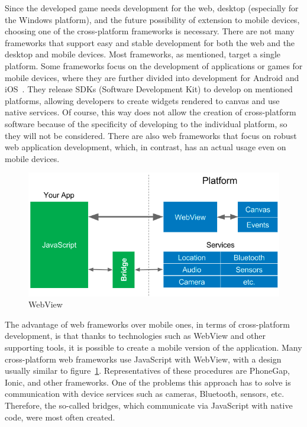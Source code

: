 Since the developed game needs development for the web, desktop (especially for the Windows platform), and the future possibility of extension to mobile devices, choosing one of the cross-platform frameworks is necessary.
There are not many frameworks that support easy and stable development for both the web and the desktop and mobile devices.
Most frameworks, as mentioned, target a single platform.
Some frameworks focus on the development of applications or games for mobile devices, where they are further divided into development for Android and iOS~\cite{leler_2017_whats}.
They release SDKs (Software Development Kit) to develop on mentioned platforms, allowing developers to create widgets rendered to canvas and use native services.
Of course, this way does not allow the creation of cross-platform software because of the specificity of developing to the individual platform, so they will not be considered.
There are also web frameworks that focus on robust web application development, which, in contrast, has an actual usage even on mobile devices.

\begin{figure}
    \centering
    \includegraphics[width=1\linewidth]{assets/design/webview.png}
    \caption{WebView~\cite{leler_2017_whats}}
    \label{fig:design:webview}
\end{figure}

The advantage of web frameworks over mobile ones, in terms of cross-platform development, is that thanks to technologies such as WebView and other supporting tools, it is possible to create a mobile version of the application.
Many cross-platform web frameworks use JavaScript with WebView, with a design usually similar to figure~\ref{fig:design:webview}.
Representatives of these procedures are PhoneGap, Ionic, and other frameworks.
One of the problems this approach has to solve is communication with device services such as cameras, Bluetooth, sensors, etc.
Therefore, the so-called bridges, which communicate via JavaScript with native code, were most often created.

